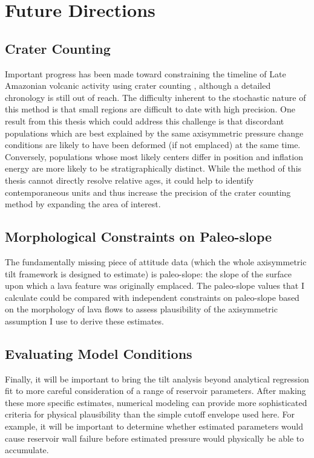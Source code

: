 \section{Future Directions}

\subsection{Crater Counting}
Important progress has been made toward constraining the timeline of Late Amazonian volcanic activity using crater counting \parencite{kneissl_map-projection-independent_2011,robbins_volcanic_2011,
robbins_large_2013,
platz_crater-based_2013}, although a detailed chronology is still out of reach. The difficulty inherent to the stochastic nature of this method is that small regions are difficult to date with high precision. One result from this thesis which could address this challenge is that discordant populations which are best explained by the same axisymmetric pressure change conditions are likely to have been deformed (if not emplaced) at the same time. Conversely, populations whose most likely centers differ in position and inflation energy are more likely to be stratigraphically distinct. While the method of this thesis cannot directly resolve relative ages, it could help to identify contemporaneous units and thus increase the precision of the crater counting method by expanding the area of interest.

\subsection{Morphological Constraints on Paleo-slope}

The fundamentally missing piece of attitude data (which the whole axisymmetric tilt framework is designed to estimate) is paleo-slope: the slope of the surface upon which a lava feature was originally emplaced. The paleo-slope values that I calculate could be compared with independent constraints on paleo-slope based on the morphology of lava flows \parencite{wadge_lobes_1991, peitersen_correlations_2000, peters_lava_2021} to assess plausibility of the axisymmetric assumption I use to derive these estimates.

\subsection{Evaluating Model Conditions}

Finally, it will be important to bring the tilt analysis beyond analytical regression fit to more careful consideration of a range of reservoir parameters. After making these more specific estimates, numerical modeling can provide more sophisticated criteria for physical plausibility than the simple cutoff envelope used here. For example, it will be important to determine whether estimated parameters would cause reservoir wall failure before estimated pressure would physically be able to accumulate. 